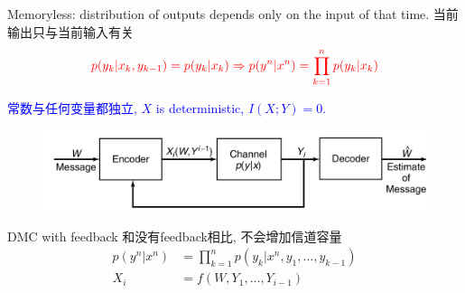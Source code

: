 Memoryless: distribution of outputs depends only on the input of that time. 当前输出只与当前输入有关
$$\textcolor{red}{p(y_k|x_k,y_{k-1})=p(y_k|x_k)\Rightarrow p(y^n|x^n)=\prod\limits_{k=1}^np(y_k|x_k)}$$

\textcolor{blue}{常数与任何变量都独立, $X$ is deterministic, $I(X;Y)=0$.}

\begin{figure}[htbp]
    \centering
    \includegraphics[width=\textwidth]{./figures/chapter5/feedback_channel.png}
\end{figure}


DMC with feedback 和没有feedback相比, 不会增加信道容量
\begin{align*}
p(y^n|x^n) &= \prod\limits_{k=1}^np(y_k|x^n,y_1,\ldots,y_{k-1}) \\
X_i &= f(W,Y_1,\ldots,Y_{i-1})
\end{align*}